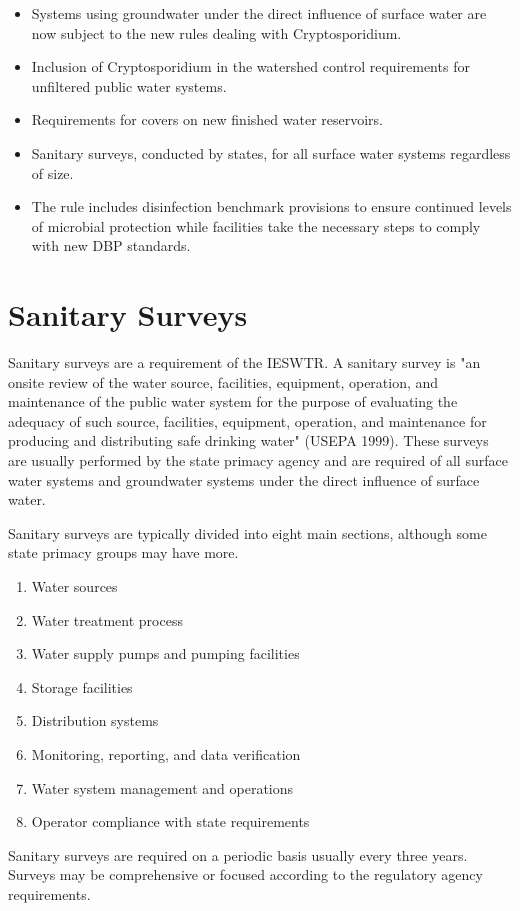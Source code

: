 \documentclass[10pt]{article}
\begin{document}
\begin{itemize}
  \item Systems using groundwater under the direct influence of surface water are now subject to the new rules dealing with Cryptosporidium.

  \item Inclusion of Cryptosporidium in the watershed control requirements for unfiltered public water systems.

  \item Requirements for covers on new finished water reservoirs.

  \item Sanitary surveys, conducted by states, for all surface water systems regardless of size.

  \item The rule includes disinfection benchmark provisions to ensure continued levels of microbial protection while facilities take the necessary steps to comply with new DBP standards.

\end{itemize}
\section{Sanitary Surveys}
Sanitary surveys are a requirement of the IESWTR. A sanitary survey is "an onsite review of the water source, facilities, equipment, operation, and maintenance of the public water system for the purpose of evaluating the adequacy of such source, facilities, equipment, operation, and maintenance for producing and distributing safe drinking water" (USEPA 1999). These surveys are usually performed by the state primacy agency and are required of all surface water systems and groundwater systems under the direct influence of surface water.

Sanitary surveys are typically divided into eight main sections, although some state primacy groups may have more.

\begin{enumerate}
  \item Water sources

  \item Water treatment process

  \item Water supply pumps and pumping facilities

  \item Storage facilities

  \item Distribution systems

  \item Monitoring, reporting, and data verification

  \item Water system management and operations

  \item Operator compliance with state requirements

\end{enumerate}
Sanitary surveys are required on a periodic basis usually every three years. Surveys may be comprehensive or focused according to the regulatory agency requirements.
\end{document}
